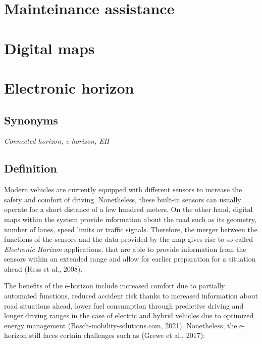 \documentclass[
]{book}
\begin{document}
\hypertarget{mainteinance-assistance}{%
\section{Mainteinance assistance}\label{mainteinance-assistance}}

\hypertarget{digital-maps}{%
\section{Digital maps}\label{digital-maps}}

\hypertarget{electronic-horizon}{%
\section{Electronic horizon}\label{electronic-horizon}}

\hypertarget{synonyms-12}{%
\subsection*{Synonyms}\label{synonyms-12}}

\emph{Connected horizon, e-horizon, EH}

\hypertarget{definition-14}{%
\subsection*{Definition}\label{definition-14}}

Modern vehicles are currently equipped with different sensors to increase the safety and comfort of driving. Nonetheless, these built-in sensors can usually operate for a short distance of a few hundred meters. On the other hand, digital maps within the system provide information about the road such as its geometry, number of lanes, speed limits or traffic signals. Therefore, the merger between the functions of the sensors and the data provided by the map gives rise to so-called \emph{Electronic Horizon} applications, that are able to provide information from the sensors within an extended range and allow for earlier preparation for a situation ahead (Ress et al., 2008).

The benefits of the e-horizon include increased comfort due to partially automated functions, reduced accident risk thanks to increased information about road situations ahead, lower fuel consumption through predictive driving and longer driving ranges in the case of electric and hybrid vehicles due to optimized energy management (Bosch-mobility-solutions.com, 2021). Nonetheless, the e-horizon still faces certain challenges such as (Grewe et al., 2017):
\end{document}
